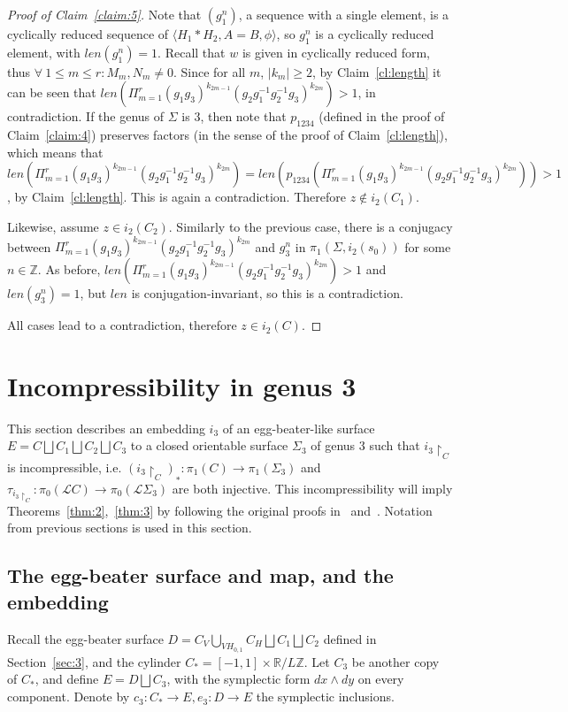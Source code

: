\documentclass[11pt]{article}
\newcommand{\R}{\mathbb{R}}
\newcommand{\Z}{\mathbb{Z}}
\begin{document}
\begin{proof}[Proof of Claim~\ref{claim:5}]
                Note that $(g_1^n)$, a sequence with a single element, is a cyclically reduced sequence of $\langle H_1*H_2 , A=B, \phi \rangle$, so $g_1^n$ is a cyclically reduced element, with $len(g_1^n) = 1$. Recall that $w$ is given in cyclically reduced form, thus $\forall \ 1 \leq m \leq r: M_m, N_m \neq 0$. Since for all $m$, $|k_m| \geq 2$, by Claim~\ref{cl:length} it can be seen that $len \left(\Pi_{m=1}^r (g_1 g_3)^{k_{2m-1}} (g_2 g_1^{-1} g_2^{-1}g_3)^{k_{2m}} \right) > 1$, in contradiction. If the genus of $\Sigma$ is 3, then note that $p_{1234}$ (defined in the proof of Claim~\ref{claim:4}) preserves factors (in the sense of the proof of Claim~\ref{cl:length}), which means that $len(\Pi_{m=1}^r (g_1 g_3)^{k_{2m-1}} (g_2 g_1^{-1} g_2^{-1}g_3)^{k_{2m}}) = len(p_{1234}(\Pi_{m=1}^r (g_1 g_3)^{k_{2m-1}} (g_2 g_1^{-1} g_2^{-1}g_3)^{k_{2m}})) > 1$, by Claim~\ref{cl:length}. This is again a contradiction. Therefore $z \not\in i_2(C_1)$.

                Likewise, assume $z \in i_2(C_2)$. Similarly to the previous case, there is a conjugacy between $\Pi_{m=1}^r (g_1 g_3)^{k_{2m-1}} (g_2 g_1^{-1} g_2^{-1}g_3)^{k_{2m}}$ and $g_3^n$ in $\pi_1(\Sigma, i_2(s_0))$ for some $n \in \Z$. As before, $len(\Pi_{m=1}^r (g_1 g_3)^{k_{2m-1}} (g_2 g_1^{-1} g_2^{-1}g_3)^{k_{2m}}) > 1$ and $len(g_3^n) = 1$, but $len$ is conjugation-invariant, so this is a contradiction.
                
                All cases lead to a contradiction, therefore $z \in i_2(C)$.
            \end{proof}


\section{Incompressibility in genus 3}
\label{sec:incompressibility}
    This section describes an embedding $i_3$ of an egg-beater-like surface $E = C \bigsqcup C_1 \bigsqcup C_2 \bigsqcup C_3$ to a closed orientable surface $\Sigma_3$ of genus 3 such that $i_3 \restriction_C$ is incompressible, i.e. $(i_3 \restriction_C)_*: \pi_1(C) \to \pi_1(\Sigma_3)$ and $\tau_{i_3 \restriction_C}: \pi_0(\mathscr{L}C) \to \pi_0(\mathscr{L}\Sigma_3)$ are both injective. This incompressibility will imply Theorems~\ref{thm:2},~\ref{thm:3} by following the original proofs in~\cite{PS14} and~\cite{10}. Notation from previous sections is used in this section.
    
    \subsection{The egg-beater surface and map, and the embedding}
        Recall the egg-beater surface $D = C_V \bigcup_{VH_{0,1}} C_H \bigsqcup C_1 \bigsqcup C_2$ defined in Section~\ref{sec:3}, and the cylinder $C_* = [-1,1] \times \R / L\Z$. Let $C_3$ be another copy of $C_*$, and define $E = D \bigsqcup C_3$, with the symplectic form $dx \wedge dy$ on every component. Denote by $c_3: C_* \to E, e_3: D \to E$ the symplectic inclusions.
        
\end{document}
